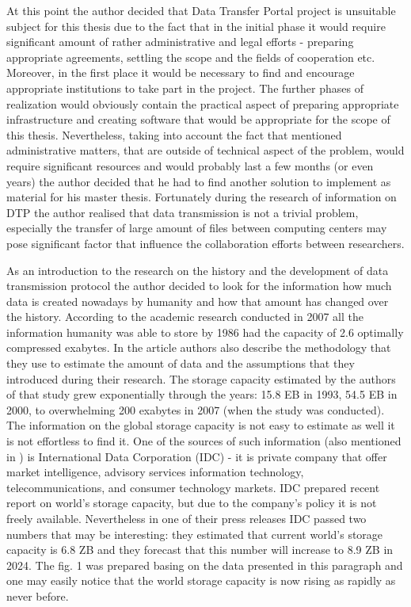 \documentclass[magisterska,en]{pracamgr}
\begin{document}
At this point the author decided that Data Transfer Portal project is unsuitable subject for this thesis due to the fact that in the initial phase it would require significant amount of rather administrative and legal efforts - preparing appropriate agreements, settling the scope and the fields of cooperation etc. Moreover, in the first place it would be necessary to find and encourage appropriate institutions to take part in the project. The further phases of realization would obviously contain the practical aspect of preparing appropriate infrastructure and creating software that would be appropriate for the scope of this thesis. Nevertheless, taking into account the fact that mentioned administrative matters, that are outside of technical aspect of the problem, would require significant resources and would probably last a few months (or even years) the author decided that he had to find another solution to implement as material for his master thesis. Fortunately during the research of information on DTP the author realised that data transmission is not a trivial problem, especially the transfer of large amount of files between computing centers may pose significant factor that influence the collaboration efforts between researchers.


\newpage
As an introduction to the research on the history and the development of data transmission protocol the author decided to look for the information how much data is created nowadays by humanity and how that amount has changed over the history. According to the academic research conducted in 2007 all the information humanity was able to store by 1986 had the capacity of 2.6 optimally compressed exabytes. In the article authors also describe the methodology that they use to estimate the amount of data and the assumptions that they introduced during their research. The storage capacity estimated by the authors of that study grew exponentially through the years: 15.8 EB in 1993, 54.5 EB in 2000, to overwhelming 200 exabytes in 2007 (when the study was conducted). \cite{Storage_study1} The information on the global storage capacity is not easy to estimate as well it is not effortless to find it. One of the sources of such information (also mentioned in \cite{Storage_study1}) is International Data Corporation (IDC) - it is private company that offer market intelligence, advisory services information technology, telecommunications, and consumer technology markets. \cite{IDC_about} IDC prepared recent report on world's storage capacity, but due to the company's policy it is not freely available. Nevertheless in one of their press releases IDC passed two numbers that may be interesting: they estimated that current world's storage capacity is 6.8 ZB and they forecast that this number will increase to 8.9 ZB in 2024. \cite{IDC_press} The fig. 1 was prepared basing on the data presented in this paragraph and one may easily notice that the world storage capacity is now rising as rapidly as never before.
\end{document}
